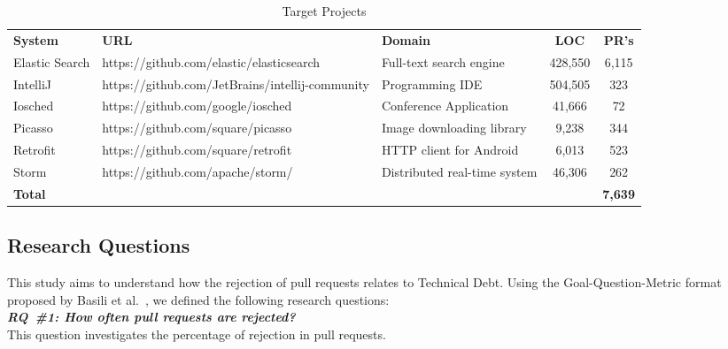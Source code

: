 \documentclass{sig-alternate}
\begin{document}
\begin{table}[ht]
\centering
\caption{Target Projects}
  \begin{tabular}{lp{7cm}p{4.5cm}cc}
    \rowcolor{gray!50}
{\bf System}	& {\bf URL} 	& {\bf Domain}	& {\bf LOC}	& {\bf PR's}\\[0.166cm]
Elastic Search &	https://github.com/elastic/elasticsearch	& Full-text search engine &	428,550 & 	6,115\\[0.201cm]
IntelliJ &	https://github.com/JetBrains/intellij-community	 & Programming IDE & 	504,505	 & 323\\[0.201cm]
Iosched	 & https://github.com/google/iosched & 	Conference Application	 & 41,666	 & 72\\[0.201cm]
Picasso & 	https://github.com/square/picasso & 	Image downloading library	 & 9,238	 & 344\\[0.201cm]
Retrofit & 	https://github.com/square/retrofit	 & HTTP client for Android  & 	6,013	 & 523\\[0.201cm]
Storm	 & https://github.com/apache/storm/ & 	Distributed real-time system & 	46,306	 & 262\\[0.201cm]
    \rowcolor{gray!50}
{\bf Total}		&&&&		{\bf 7,639}
  \end{tabular}

  \label{tb:projects}  
\end{table}

\subsection{Research Questions}

This study aims to understand how the rejection of pull requests relates to Technical Debt. 
Using the Goal-Question-Metric format proposed by Basili et al.~\cite{3}, 
we defined the following research questions:\\

\newcommand{\rqi}{{\noindent\centering\bf\em RQ~\#1: How often pull requests are rejected?}}
\rqi\\[-0.2cm]

This question investigates the percentage of rejection in pull requests.\\
\end{document}
